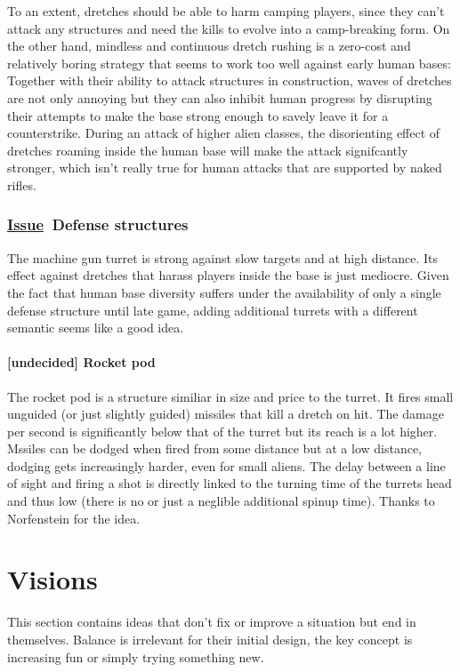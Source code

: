 \documentclass{scrartcl}
\newcommand{\issue}    [0]{\textbf{\underline{Issue}\ }}
\newcommand{\undecided}[0]{\textcolor{undecided}{\textbf{[undecided] }}}
\begin{document}
To an extent, dretches should be able to harm camping players, since they can't attack any structures and need the kills to evolve into a camp-breaking form. On the other hand, mindless and continuous dretch rushing is a zero-cost and relatively boring strategy that seems to work too well against early human bases: Together with their ability to attack structures in construction, waves of dretches are not only annoying but they can also inhibit human progress by disrupting their attempts to make the base strong enough to savely leave it for a counterstrike. During an attack of higher alien classes, the disorienting effect of dretches roaming inside the human base will make the attack signifcantly stronger, which isn't really true for human attacks that are supported by naked rifles.

\subsubsection{\issue Defense structures}

The machine gun turret is strong against slow targets and at high distance. Its effect against dretches that harass players inside the base is just mediocre. Given the fact that human base diversity suffers under the availability of only a single defense structure until late game, adding additional turrets with a different semantic seems like a good idea.

\paragraph{\undecided Rocket pod}

The rocket pod is a structure similiar in size and price to the turret. It fires small unguided (or just slightly guided) missiles that kill a dretch on hit. The damage per second is significantly below that of the turret but its reach is a lot higher. Mssiles can be dodged when fired from some distance but at a low distance, dodging gets increasingly harder, even for small aliens. The delay between a line of sight and firing a shot is directly linked to the turning time of the turrets head and thus low (there is no or just a neglible additional spinup time). Thanks to Norfenstein for the idea.

\section{Visions}

This section contains ideas that don't fix or improve a situation but end in themselves. Balance is irrelevant for their initial design, the key concept is increasing fun or simply trying something new.
\end{document}
